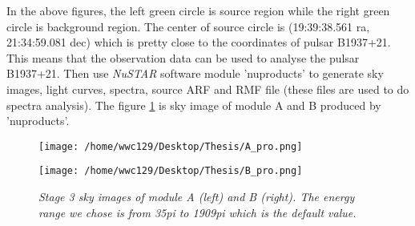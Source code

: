 \documentclass[12pt]{report}
\newcommand{\mycaption}[1]{\caption{\textit{\footnotesize #1}}}
\begin{document}
        In the above figures, the left green circle is source region while the right green circle is 
        background region. The center of source circle is (19:39:38.561 ra, 21:34:59.081 dec) which is pretty 
        close to the coordinates of pulsar B1937+21. This means that the observation data can be used to analyse 
        the pulsar B1937+21. Then use \textit{NuSTAR} software module 'nuproducts' to generate sky images, light 
        curves, spectra, source ARF and RMF file (these files are used to do spectra analysis). The figure 
        \ref{fig:sky1} is sky image of module A and B produced by 'nuproducts'.\\
        \begin{figure}[h!]
          \begin{minipage}{0.45\textwidth}
            \begin{flushright}
                \texttt{[image: /home/wwc129/Desktop/Thesis/A\_pro.png]}
            \end{flushright}
          \end{minipage}
        \hspace{1cm}
          \begin{minipage}{0.45\textwidth}
            \begin{flushleft}
                \texttt{[image: /home/wwc129/Desktop/Thesis/B\_pro.png]}
            \end{flushleft}
          \end{minipage}
          \centering 
          \begin{minipage}[b]{0.85\textwidth}
            \vspace{0.25cm}
            \mycaption{Stage 3 sky images of module A (left) and B (right). The energy range we chose is from 
                        35pi to 1909pi which is the default value.}
            \label{fig:sky1}
          \end{minipage}
          
        \end{figure}
\end{document}
